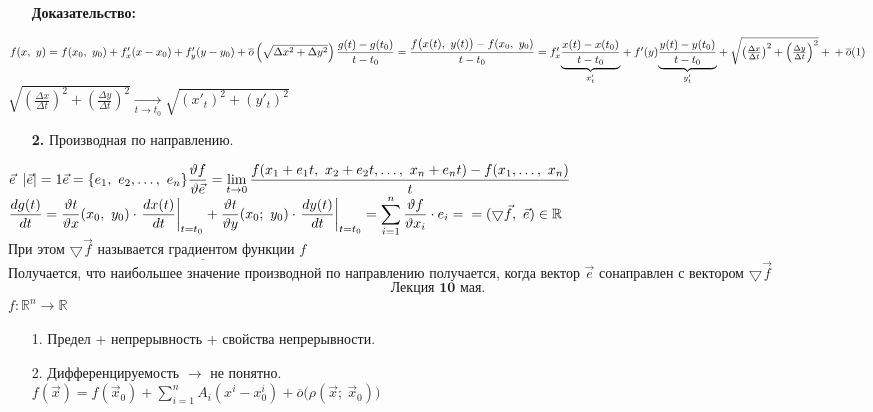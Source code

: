 \documentclass[12pt, letterpaper, twoside]{article}
\newcommand{\Underl}[1]{$\underline{\text{#1}}$}
\newcommand{\DS}{\displaystyle}
\newcommand{\Abs}[1]{\left| #1 \right|}
\newcommand{\mb}[1]{\mathbb{#1}}
\begin{document}
    \begin{enumerate}
        \item[\textbf{Доказательство:}]
    \end{enumerate}
    $f(x,\ y) = f(x_0,\ y_0) + f'_x(x - x_0) + f'_y(y - y_0) + \overline{o}\left(\sqrt{\Delta x^2 + \Delta y^2}\right)
    \dfrac{g(t) - g(t_0)}{t - t_0}= \dfrac{f\big( x(t),\ y(t)\big) - f(x_0,\ y_0)}{t - t_0} = f'_x\underset{x'_t}{\underbrace{\dfrac{x(t) - x(t_0)}{t - t_0}}} + f'(y)\underset{y'_t}{\underbrace{\dfrac{y(t) - y(t_0)}{t - t_0}}} + \sqrt{\left( \frac{\Delta x}{\Delta t}\right)^2 + \left( \frac{\Delta y}{\Delta t}\right)^2} +\\
    +\overline{o}(1)$\\
    $\sqrt{\left( \frac{\Delta x}{\Delta t}\right)^2 + \left( \frac{\Delta y}{\Delta t}\right)^2} \xrightarrow[t \to t_0]{} \sqrt{\left( x'_t\right)^2 + \left( y'_t\right)^2}$
    \begin{enumerate}
        \item[\textbf{2.}] Производная по направлению.
    \end{enumerate}
    $\vec{e}\ \Abs{\vec{e}} = 1\\
    \vec{e} = \{e_1,\ e_2,\dots,\ e_n\}\\
    \dfrac{\vartheta f}{\vartheta \vec{e}} = \DS \lim_{t\to 0} \frac{f(x_1 + e_1 t,\ x_2 + e_2 t,\dots,\ x_n + e_n t) - f(x_1,\dots,\ x_n)}{t}$\\
    $\DS \dfrac{dg(t)}{dt} = \frac{\vartheta t}{\vartheta x} (x_0,\ y_0)\cdot \left.\dfrac{d x(t)}{dt}\right|_{t = t_0} + \frac{\vartheta t}{\vartheta y} (x_0;\ y_0)\cdot \left.\frac{d y(t)}{dt}\right|_{t = t_0} = \sum_{i = 1}^{n} \frac{\vartheta f}{\vartheta x_i}\cdot e_i =\\
    =(\bigtriangledown \vec{f},\ \vec{e})\in \mathbb{R}$\\
    При этом $\bigtriangledown \vec{f}$ называется \Underl{градиентом} функции $f$\\
    Получается, что наибольшее значение производной по направлению получается, когда вектор $\vec{e}$ сонаправлен с вектором $\bigtriangledown \vec{f}$
    \[\textbf{Лекция 10 мая.}\]
    $f:\mb{R}^n\to \mb{R}$
    \begin{enumerate}
        \item[1.] Предел + непрерывность + свойства непрерывности.
        \item[2.] Дифференцируемость $\to$ не понятно.\\
        $f(\vec{x}) = f(\vec{x}_0) + \DS\sum_{i = 1}^{n} A_i(x^i - x^i_0) + \overline{o}\big(\rho(\vec{x};\ \vec{x}_0)\big)$
    \end{enumerate}
\end{document}

